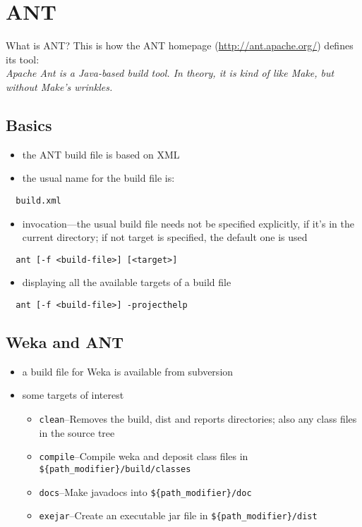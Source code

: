 
\section{ANT}

What is ANT? This is how the ANT homepage (\url{http://ant.apache.org/}{}) defines its tool:\\

\noindent \emph{Apache Ant is a Java-based build tool. In theory, it is kind of like Make, but without Make's wrinkles.}

\subsection{Basics}

\begin{itemize}
\item the ANT build file is based on XML
\item the usual name for the build file is:
\end{itemize}

\verb=  build.xml=

\begin{itemize}
\item invocation---the usual build file needs not be specified explicitly, if it's in the current directory; if not target is specified, the default one is used
\end{itemize}

\verb=  ant [-f <build-file>] [<target>]=

\begin{itemize}
\item displaying all the available targets of a build file
\end{itemize}

\verb=  ant [-f <build-file>] -projecthelp=

\subsection{Weka and ANT}

\begin{itemize}
\item a build file for Weka is available from subversion
\item some targets of interest
  \begin{itemize}
  \item \verb=clean=--Removes the build, dist and reports directories; also any class files in the source tree
  \item \verb=compile=--Compile weka and deposit class files in\\ \verb=${path_modifier}/build/classes=
  \item \verb=docs=--Make javadocs into \verb=${path_modifier}/doc=
  \item \verb=exejar=--Create an executable jar file in \verb=${path_modifier}/dist=
  \end{itemize}
\end{itemize}

